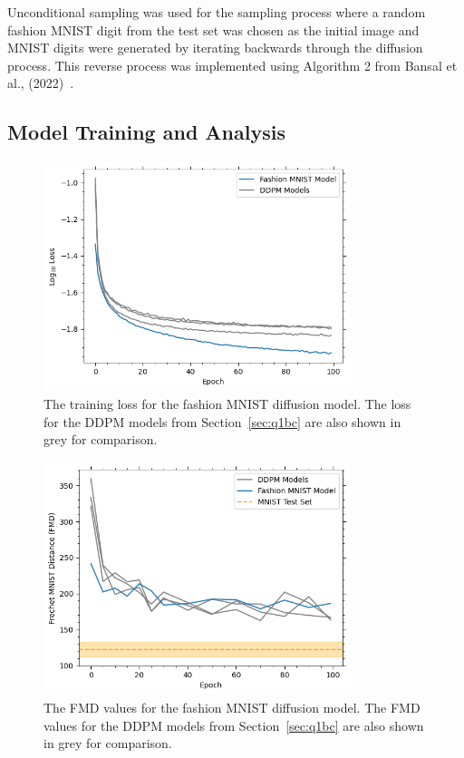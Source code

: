 Unconditional sampling was used for the sampling process where a random fashion MNIST digit from the test set was chosen
as the initial image and MNIST digits were generated by iterating backwards through the diffusion process.
This reverse process was implemented using Algorithm 2 from Bansal et al., (2022)~\cite{bansal}.

\subsection{Model Training and Analysis}\label{subsec:model-training}
\begin{figure}[t]
    \centering
    \includegraphics[width=0.8\textwidth]{figures/q2_training_loss}
    \caption{The training loss for the fashion MNIST diffusion model.
        The loss for the DDPM models from Section~\eqref{sec:q1bc} are also shown in grey for comparison.}
    \label{fig:q2_training_loss}
\end{figure}

\begin{figure}[t]
    \centering
    \includegraphics[width=0.8\textwidth]{figures/q2_fmd}
    \caption{The FMD values for the fashion MNIST diffusion model.
        The FMD values for the DDPM models from Section~\eqref{sec:q1bc} are also shown in grey for comparison.}
    \label{fig:q2_fmd}
\end{figure}


